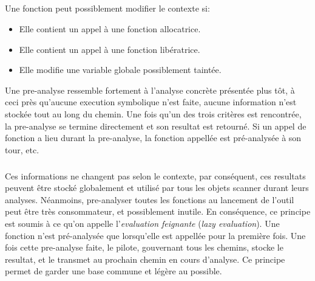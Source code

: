 \subparagraph{}
Une fonction peut possiblement modifier le contexte si:
\begin{itemize}
    \item Elle contient un appel à une fonction allocatrice.
    \item Elle contient un appel à une fonction libératrice.
    \item Elle modifie une variable globale possiblement taintée.
\end{itemize}
Une pre-analyse ressemble fortement à l'analyse concrète présentée plus tôt, à ceci près qu'aucune execution symbolique n'est faite, aucune information n'est stockée
tout au long du chemin. Une fois qu'un des trois critères est rencontrée, la pre-analyse se termine directement et son resultat est retourné.
Si un appel de fonction a lieu durant la pre-analyse, la fonction appellée est pré-analysée à son tour, etc.
\subparagraph{}
Ces informations ne changent pas selon le contexte, par conséquent, ces resultats peuvent être stocké globalement et utilisé par tous les objets scanner
durant leurs analyses. Néanmoins, pre-analyser toutes les fonctions au lancement de l'outil peut être très consommateur, et possiblement inutile. En conséquence,
ce principe est soumis à ce qu'on appelle l'\textit{evaluation feignante} (\textit{lazy evaluation}). Une fonction n'est pré-analysée que lorsqu'elle est appellée pour la première fois.
Une fois cette pre-analyse faite, le pilote, gouvernant tous les chemins, stocke le resultat, et le transmet au prochain chemin en cours d'analyse. Ce principe permet de garder une base
commune et légère au possible.

